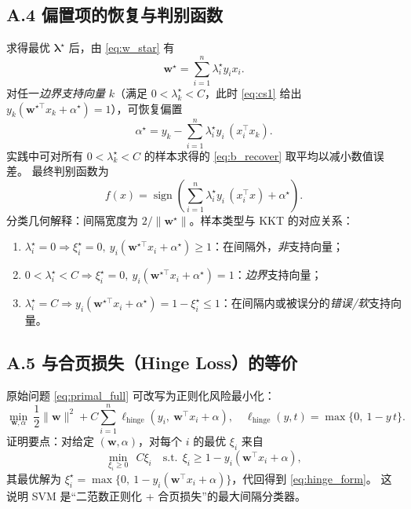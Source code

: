 \documentclass[10.5pt,hyperref,a4paper,UTF8]{ctexart}
\theoremstyle{definition}
\begin{document}
\subsection*{A.4 偏置项的恢复与判别函数}
求得最优 $\bm\lambda^\star$ 后，由 \eqref{eq:w_star} 有
\[
\bm w^\star = \sum_{i=1}^n \lambda_i^\star y_i x_i.
\]
对任一\emph{边界支持向量} $k$（满足 $0<\lambda_k^\star<C$，此时 \eqref{eq:cs1} 给出 $y_k(\bm w^{\star\top}x_k+\alpha^\star)=1$），可恢复偏置
\begin{equation}\label{eq:b_recover}
\alpha^\star = y_k - \sum_{i=1}^n \lambda_i^\star y_i\, (x_i^\top x_k).
\end{equation}
实践中可对所有 $0<\lambda_k^\star<C$ 的样本求得的 \eqref{eq:b_recover} 取平均以减小数值误差。
最终判别函数为
\begin{equation}\label{eq:decision}
f(x) = \operatorname{sign}\!\left(\sum_{i=1}^n \lambda_i^\star y_i\, (x_i^\top x) + \alpha^\star\right).
\end{equation}
分类几何解释：间隔宽度为 $2/\|\bm w^\star\|$。样本类型与 KKT 的对应关系：
\begin{enumerate}
\item $\lambda_i^\star=0 \Rightarrow \xi_i^\star=0,\ y_i(\bm w^{\star\top}x_i+\alpha^\star)\ge 1$：在间隔外，\emph{非}支持向量；
\item $0<\lambda_i^\star<C \Rightarrow \xi_i^\star=0,\ y_i(\bm w^{\star\top}x_i+\alpha^\star)=1$：\emph{边界}支持向量；
\item $\lambda_i^\star=C \Rightarrow y_i(\bm w^{\star\top}x_i+\alpha^\star)=1-\xi_i^\star\le 1$：在间隔内或被误分的\emph{错误/软}支持向量。
\end{enumerate}

\subsection*{A.5 与合页损失（Hinge Loss）的等价}
原始问题 \eqref{eq:primal_full} 可改写为正则化风险最小化：
\begin{equation}\label{eq:hinge_form}
\min_{\bm w,\alpha}\ \frac{1}{2}\|\bm w\|^2 + C\sum_{i=1}^n \ell_{\text{hinge}}\!\left(y_i,\ \bm w^\top x_i+\alpha\right),
\quad
\ell_{\text{hinge}}(y,t)=\max\{0,\ 1-y\,t\}.
\end{equation}
证明要点：对给定 $(\bm w,\alpha)$，对每个 $i$ 的最优 $\xi_i$ 来自
\[
\min_{\xi_i\ge0}\ \ C\xi_i\quad \text{s.t.}\ \ \xi_i \ge 1-y_i(\bm w^\top x_i+\alpha),
\]
其最优解为 $\xi_i^\star=\max\{0,\ 1-y_i(\bm w^\top x_i+\alpha)\}$，代回得到 \eqref{eq:hinge_form}。
这说明 SVM 是“二范数正则化 + 合页损失”的最大间隔分类器。
\end{document}
